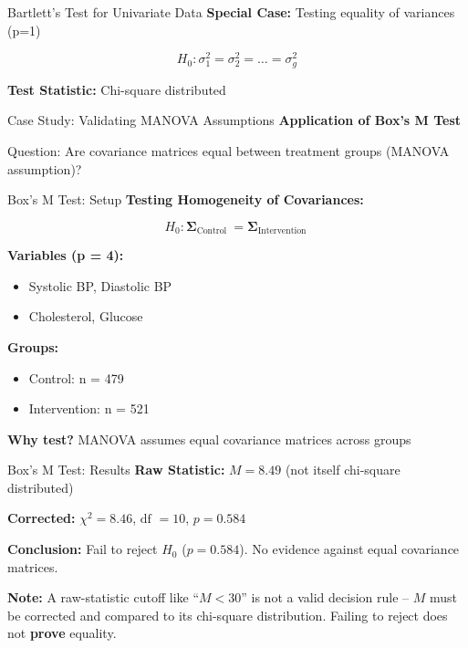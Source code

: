 \documentclass[aspectratio=169,ignorenonframetext]{beamer}
\begin{document}
\begin{frame}{Bartlett's Test for Univariate Data}
\textbf{Special Case:} Testing equality of variances (p=1)

\[H_{0}:\sigma_{1}^{2} = \sigma_{2}^{2} = \ldots = \sigma_{g}^{2}\]

\textbf{Test Statistic:} Chi-square distributed
\end{frame}

\begin{frame}{Case Study: Validating MANOVA Assumptions}
\textbf{Application of Box's M Test}

Question: Are covariance matrices equal between treatment groups (MANOVA
assumption)?
\end{frame}

\begin{frame}{Box's M Test: Setup}
\textbf{Testing Homogeneity of Covariances:}

\[H_{0}:\mathbf{\Sigma}_{\text{Control }} = \mathbf{\Sigma}_{\text{Intervention }}\]

\textbf{Variables (p = 4):}

\begin{itemize}
\item
  Systolic BP, Diastolic BP
\item
  Cholesterol, Glucose
\end{itemize}

\textbf{Groups:}

\begin{itemize}
\item
  Control: n = 479
\item
  Intervention: n = 521
\end{itemize}

\textbf{Why test?} MANOVA assumes equal covariance matrices across
groups
\end{frame}

\begin{frame}{Box's M Test: Results}
\textbf{Raw Statistic:} \(M = 8.49\) (not itself chi-square distributed)

\textbf{Corrected:} \(\chi^{2} = 8.46\), \(\text{df } = 10\),
\(p = 0.584\)

\textbf{Conclusion:} Fail to reject \(H_{0}\) (\(p = 0.584\)). No
evidence against equal covariance matrices.

\textbf{Note:} A raw-statistic cutoff like ``\(M < 30\)'' is not a valid
decision rule -- \(M\) must be corrected and compared to its chi-square
distribution. Failing to reject does not \textbf{prove} equality.
\end{frame}
\end{document}
